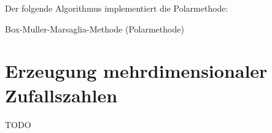 Der folgende Algorithmus implementiert die Polarmethode:
\begin{algorithm}[h!]
\DontPrintSemicolon
\LinesNumbered
{}


\caption{Box-Muller-Marsaglia-Methode (Polarmethode)}
\label{algo:box-muller-marsaglia}
\end{algorithm}

\section{Erzeugung mehrdimensionaler Zufallszahlen}

TODO
